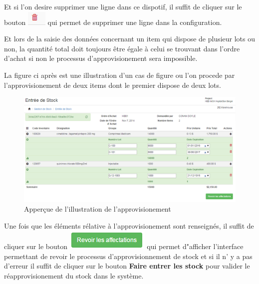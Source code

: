 \documentclass[12pt,a4paper]{report}
\begin{document}
Et si l'on desire supprimer une ligne dans ce dispotif, il suffit de cliquer sur le bouton \includegraphics[scale=0.7]{pic/DeleteWRed.png} qui permet de supprimer une ligne dans la configuration.

Et lors de la saisie des données concernant un item qui dispose de plusieur lots ou non, la quantité total doit toujours être égale à celui se trouvant dans l'ordre d'achat si non le processus d'approvisionement sera impossible.

La figure ci après est une illustration d'un cas de figure ou l'on procede par l'approvisionement de deux items dont le premier dispose de deux lots.

\begin{figure}[h]
\begin{center}
\includegraphics[width=12cm]{pic/AppStockOK.png}
\end{center}
\caption{Apperçue de l'illustration de l'approvisionement}
\label{Apperçue de l'illustration de l'approvisionement}
\end{figure}

Une fois que les éléments rélative à l'approvisionement sont renseignés, il suffit de cliquer sur le bouton \includegraphics[scale=0.7]{pic/RevAffectation.png} qui permet d"afficher l'interface permettant de revoir le processus d'approvisionnement de stock et si il n' y a pas d'erreur il suffit de cliquer sur le bouton \textbf{Faire entrer les stock} pour valider le réapprovisionement du stock dans le système.
\end{document}
